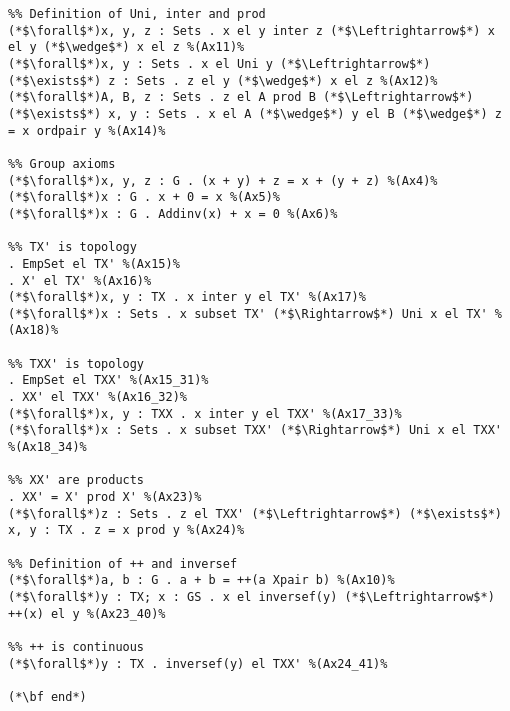 \documentclass[preview]{standalone}
\begin{document}
\begin{lstlisting}
%% Definition of Uni, inter and prod
(*$\forall$*)x, y, z : Sets . x el y inter z (*$\Leftrightarrow$*) x el y (*$\wedge$*) x el z %(Ax11)%
(*$\forall$*)x, y : Sets . x el Uni y (*$\Leftrightarrow$*) (*$\exists$*) z : Sets . z el y (*$\wedge$*) x el z %(Ax12)%
(*$\forall$*)A, B, z : Sets . z el A prod B (*$\Leftrightarrow$*) (*$\exists$*) x, y : Sets . x el A (*$\wedge$*) y el B (*$\wedge$*) z = x ordpair y %(Ax14)%

%% Group axioms
(*$\forall$*)x, y, z : G . (x + y) + z = x + (y + z) %(Ax4)%
(*$\forall$*)x : G . x + 0 = x %(Ax5)%
(*$\forall$*)x : G . Addinv(x) + x = 0 %(Ax6)%

%% TX' is topology
. EmpSet el TX' %(Ax15)%
. X' el TX' %(Ax16)%
(*$\forall$*)x, y : TX . x inter y el TX' %(Ax17)%
(*$\forall$*)x : Sets . x subset TX' (*$\Rightarrow$*) Uni x el TX' %(Ax18)%

%% TXX' is topology
. EmpSet el TXX' %(Ax15_31)%
. XX' el TXX' %(Ax16_32)%
(*$\forall$*)x, y : TXX . x inter y el TXX' %(Ax17_33)%
(*$\forall$*)x : Sets . x subset TXX' (*$\Rightarrow$*) Uni x el TXX' %(Ax18_34)%

%% XX' are products
. XX' = X' prod X' %(Ax23)%
(*$\forall$*)z : Sets . z el TXX' (*$\Leftrightarrow$*) (*$\exists$*) x, y : TX . z = x prod y %(Ax24)%

%% Definition of ++ and inversef
(*$\forall$*)a, b : G . a + b = ++(a Xpair b) %(Ax10)%
(*$\forall$*)y : TX; x : GS . x el inversef(y) (*$\Leftrightarrow$*) ++(x) el y %(Ax23_40)%

%% ++ is continuous
(*$\forall$*)y : TX . inversef(y) el TXX' %(Ax24_41)%

(*\bf end*)
\end{lstlisting}
\end{document}
